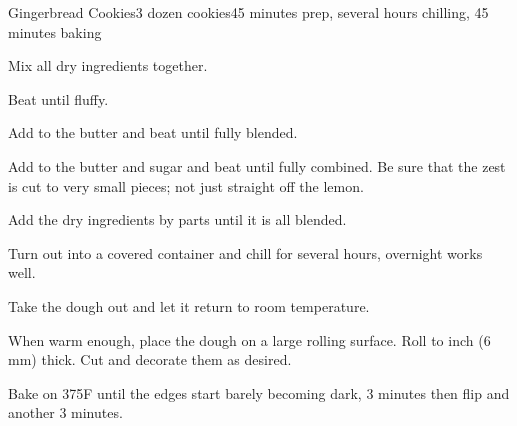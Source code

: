 \documentclass[../Cookbook.tex]{subfiles}
\begin{document}
\begin{recipe}{Gingerbread Cookies}{3 dozen cookies}{45 minutes prep, several hours chilling, 45 minutes baking}

	Mix all dry ingredients together.

	Beat until fluffy.

	Add to the butter and beat until fully blended.

	Add to the butter and sugar and beat until fully combined. Be sure that the zest is cut to very small pieces; not just straight off the lemon. %

	Add the dry ingredients by parts until it is all blended.

	Turn out into a covered container and chill for several hours, overnight works well.

	\newstep
	Take the dough out and let it return to room temperature.

	When warm enough, place the dough on a large rolling surface.
	Roll to  inch (6 mm) thick.
	Cut and decorate them as desired.

	\newstep
	Bake on 375\0F until the edges start barely becoming dark,
	3 minutes then flip and another 3 minutes.


\end{recipe}
\end{document}
